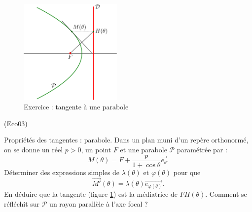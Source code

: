 \begin{figure}[ht]
 \centering
 \includegraphics[width=5cm]{Eco03_1.pdf}
 \caption{Exercice  : tangente à une parabole}
 \label{fig:Eco3_1}
\end{figure}

\begin{tiny}(Eco03)\end{tiny} Propriétés des tangentes : parabole.\newline
Dans un plan muni d'un repère orthonormé, on se donne un réel $p>0$, un point $F$ et une parabole $\mathcal P$ paramétrée par :
\begin{displaymath}
 M(\theta) = F + \frac{p}{1+ \cos\theta}\overrightarrow{e_\theta}.
\end{displaymath}
Déterminer des expressions simples de $\lambda(\theta)$ et $\varphi(\theta)$ pour que
\begin{displaymath}
 \overrightarrow{M'}(\theta) = \lambda(\theta)\overrightarrow{e_{\varphi(\theta)}}.
\end{displaymath}
En déduire que la tangente (figure \ref{fig:Eco3_1}) est la médiatrice de $FH(\theta)$. Comment se réfléchit sur $\mathcal P$ un rayon parallèle à l'axe focal ?
